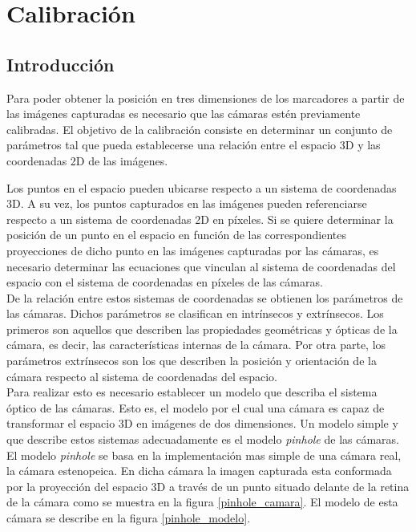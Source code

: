 \chapter{Calibración}
\label{calibracion}

\section{Introducción}
Para poder obtener la posición en tres dimensiones de los marcadores a partir de las imágenes capturadas es necesario que las cámaras estén previamente calibradas. El objetivo de la calibración consiste en determinar un conjunto de parámetros tal que pueda establecerse una relación entre el espacio 3D y las coordenadas 2D de las imágenes.\\
\vspace{-0.1cm}


Los puntos en el espacio pueden ubicarse respecto a un sistema de coordenadas 3D. A su vez, los puntos capturados en las imágenes pueden referenciarse respecto a un sistema de coordenadas 2D en píxeles. Si se quiere determinar la posición de un punto en el espacio en función de las correspondientes proyecciones de dicho punto en las imágenes capturadas por las cámaras, es necesario determinar las ecuaciones que vinculan al sistema de coordenadas del espacio con el sistema de coordenadas en píxeles de las cámaras.\\

De la relación entre estos sistemas de coordenadas se obtienen los parámetros de las cámaras. Dichos parámetros se clasifican en intrínsecos y extrínsecos. Los primeros son aquellos que describen las propiedades geométricas y ópticas de la cámara, es decir, las características internas de la cámara. Por otra parte, los parámetros extrínsecos son los que describen la posición y orientación de la cámara respecto al sistema de coordenadas del espacio.\\

Para realizar esto es necesario establecer un modelo que describa el sistema óptico de las cámaras. Esto es, el modelo por el cual una cámara es capaz de transformar el espacio 3D en imágenes de dos dimensiones. Un modelo simple y que describe estos sistemas adecuadamente es el modelo \textit{pinhole} de las cámaras. 
El modelo \textit{pinhole} se basa en la implementación mas simple de una cámara real, la cámara estenopeica. En dicha cámara la imagen capturada esta conformada por la proyección del espacio 3D a través de un punto situado delante de la retina de la cámara como se muestra en la figura \ref{pinhole_camara}. El modelo de esta cámara se describe en la figura \ref{pinhole_modelo}.\\

